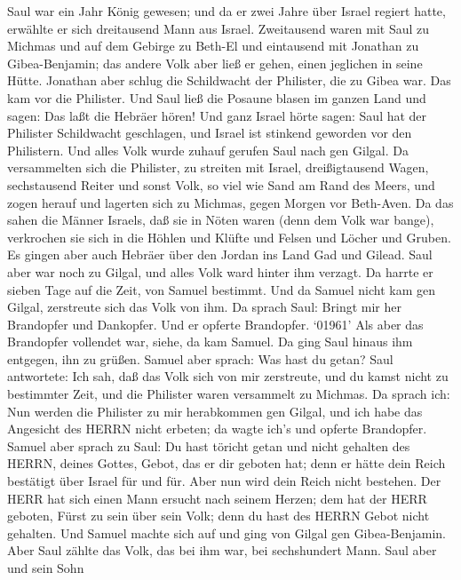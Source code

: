  Saul war ein Jahr König gewesen; und da er zwei Jahre über
Israel regiert hatte,  erwählte er sich dreitausend Mann aus
Israel. Zweitausend waren mit Saul zu Michmas und auf dem Gebirge zu
Beth-El und eintausend mit Jonathan zu Gibea-Benjamin; das andere Volk
aber ließ er gehen, einen jeglichen in seine Hütte. 
Jonathan aber schlug die Schildwacht der Philister, die zu Gibea war.
Das kam vor die Philister. Und Saul ließ die Posaune blasen im ganzen
Land und sagen: Das laßt die Hebräer hören!  Und ganz Israel
hörte sagen: Saul hat der Philister Schildwacht geschlagen, und Israel
ist stinkend geworden vor den Philistern. Und alles Volk wurde zuhauf
gerufen Saul nach gen Gilgal.  Da versammelten sich die
Philister, zu streiten mit Israel, dreißigtausend Wagen, sechstausend
Reiter und sonst Volk, so viel wie Sand am Rand des Meers, und zogen
herauf und lagerten sich zu Michmas, gegen Morgen vor Beth-Aven.
 Da das sahen die Männer Israels, daß sie in Nöten waren
(denn dem Volk war bange), verkrochen sie sich in die Höhlen und Klüfte
und Felsen und Löcher und Gruben.  Es gingen aber auch
Hebräer über den Jordan ins Land Gad und Gilead. Saul aber war noch zu
Gilgal, und alles Volk ward hinter ihm verzagt.  Da harrte
er sieben Tage auf die Zeit, von Samuel bestimmt. Und da Samuel nicht
kam gen Gilgal, zerstreute sich das Volk von ihm.  Da sprach
Saul: Bringt mir her Brandopfer und Dankopfer. Und er opferte
Brandopfer.  `01961' Als aber das Brandopfer vollendet war,
siehe, da kam Samuel. Da ging Saul hinaus ihm entgegen, ihn zu grüßen.
 Samuel aber sprach: Was hast du getan? Saul antwortete:
Ich sah, daß das Volk sich von mir zerstreute, und du kamst nicht zu
bestimmter Zeit, und die Philister waren versammelt zu Michmas.
 Da sprach ich: Nun werden die Philister zu mir herabkommen
gen Gilgal, und ich habe das Angesicht des HERRN nicht erbeten; da wagte
ich's und opferte Brandopfer.  Samuel aber sprach zu Saul:
Du hast töricht getan und nicht gehalten des HERRN, deines Gottes,
Gebot, das er dir geboten hat; denn er hätte dein Reich bestätigt über
Israel für und für.  Aber nun wird dein Reich nicht
bestehen. Der HERR hat sich einen Mann ersucht nach seinem Herzen; dem
hat der HERR geboten, Fürst zu sein über sein Volk; denn du hast des
HERRN Gebot nicht gehalten.  Und Samuel machte sich auf und
ging von Gilgal gen Gibea-Benjamin. Aber Saul zählte das Volk, das bei
ihm war, bei sechshundert Mann.  Saul aber und sein Sohn
